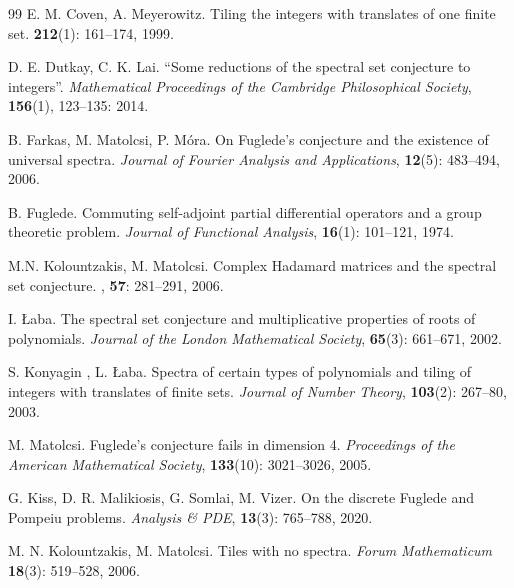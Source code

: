 \begin{thebibliography}{99}
E. M. Coven, A. Meyerowitz.
\newblock Tiling the integers with translates of one finite set.
 {\bfseries 212}(1): 161--174, 1999.

 D. E. Dutkay, C. K. Lai. 
\newblock ``Some reductions of the spectral set conjecture to integers''. 
\newblock
{\em Mathematical Proceedings of the Cambridge Philosophical Society}, \textbf{156}(1), 123--135: 2014.
            
B. Farkas, M. Matolcsi, P. M\'ora. 
\newblock
On Fuglede's conjecture and the existence of universal spectra. 
\newblock
{\em Journal of Fourier Analysis and Applications}, \textbf{12}(5): 483--494, 2006.
        
 B. Fuglede. 
\newblock
Commuting self-adjoint partial differential operators and a group theoretic problem. 
\newblock
{\em Journal of Functional Analysis}, \textbf{16}(1): 101--121, 1974.
        
M.N. Kolountzakis, M. Matolcsi. 
\newblock 
Complex Hadamard matrices and the spectral set conjecture. 
, {\bf57}: 281--291, 2006.

 I. \L aba. 
\newblock
The spectral set conjecture and multiplicative properties of roots of polynomials.
\newblock
{\em Journal of the London Mathematical Society}, \textbf{65}(3): 661--671, 2002.
        
S. Konyagin , L. \L aba. 
\newblock
Spectra of certain types of polynomials and tiling of integers with translates of finite sets. 
\newblock
{\em Journal of Number Theory}, \textbf{103}(2): 267--80, 2003.
        
        
M. Matolcsi. 
\newblock
Fuglede's conjecture fails in dimension 4. 
\newblock
{\em Proceedings of the American Mathematical Society}, \textbf{133}(10): 3021--3026, 2005.
        
G. Kiss, D. R. Malikiosis, G. Somlai, M. Vizer. 
\newblock
On the discrete Fuglede and Pompeiu problems.
\newblock 
{\em Analysis \& PDE}, \textbf{13}(3):
765--788, 2020.
         
        
M. N. Kolountzakis, M. Matolcsi. 
\newblock
Tiles with no spectra. 
\newblock
{\em Forum Mathematicum} \textbf{18}(3): 519--528, 2006.
        

\end{thebibliography}
